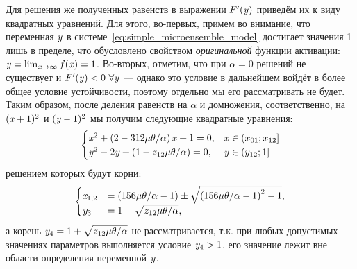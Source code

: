 Для решения же полученных равенств в выражении $F^{\prime}(\mathit{y})$ приведём их к виду квадратных уравнений. Для этого, во-первых, примем во внимание, что переменная $\mathit{y}$ в системе~\eqref{eq:simple_microensemble_model} достигает значения 1 лишь в пределе, что обусловлено свойством \textit{оригинальной} функции активации: $\mathit{y} = \lim_{\mathit{x} \to \infty} f(\mathit{x}) = 1$. Во-вторых, отметим, что при $\alpha = 0$ решений не существует и $F^{\prime}(\mathit{y}) < 0\ \forall \mathit{y}$ --- однако это условие в дальнейшем войдёт в более общее условие устойчивости, поэтому отдельно мы его рассматривать не будет. Таким образом, после деления равенств на $\alpha$ и домножения, соответственно, на $(\mathit{x} + 1)^{2}$ и $(\mathit{y} - 1)^{2}$ мы получим следующие квадратные уравнения:
\begin{equation}
    \nonumber
    \begin{cases}
        \mathit{x}^{2} + \left( 2 - 312 \mu \theta / \alpha \right) \mathit{x} + 1 = 0,     & \mathit{x} \in \left(x_{01}; x_{12}\right]    \\
        \mathit{y}^{2} - 2 \mathit{y} + \left( 1 - z_{12} \mu \theta / \alpha \right) = 0,  & \mathit{y} \in \left(y_{12}; 1\right]         \\
    \end{cases}
\end{equation}
решением которых будут корни:
\begin{equation}
    \nonumber
    \begin{cases}
        \mathit{x}_{1,2}    &= \left( 156 \mu \theta / \alpha - 1\right) \pm \sqrt{\left( 156 \mu \theta / \alpha - 1\right)^{2} - 1},      \\
        \mathit{y}_{3}      &= 1 - \sqrt{z_{12} \mu \theta / \alpha},                                                                       \\
    \end{cases}
\end{equation}
а корень $\mathit{y}_{4} = 1 + \sqrt{z_{12} \mu \theta / \alpha}$ не рассматривается, т.к. при любых допустимых значениях параметров выполняется условие $\mathit{y}_{4} > 1$, \ie его значение лежит вне области определения переменной $\mathit{y}$.

